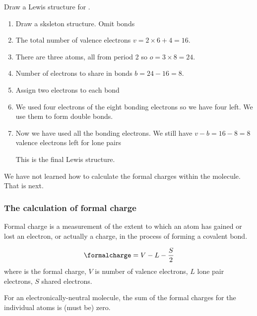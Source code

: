 \documentclass[../mit-general-chemistry.tex]{subfiles}
\begin{document}
\begin{example}
  Draw a Lewis structure for .

  \begin{enumerate}
  \item Draw a sksleton structure. Omit bonds
  \item The total number of valence electrons $v = 2\times 6 + 4 =
    16$.
  \item There are three atoms, all from period 2 so $o = 3\times 8 = 24$.
  \item Number of electrons to share in bonds $b = 24 - 16 = 8$.
  \item Assign two electrons to each bond
    \begin{center}
    \end{center}
  \item We used four electrons of the eight bonding electrons so we
    have four left. We use them to form double bonds.
    \begin{center}
    \end{center}
  \item Now we have used all the bonding electrons. We still have $v -
    b = 16 - 8 = 8$ valence electrons left for lone pairs
    \begin{center}
    \end{center}
    This is the final Lewis structure.
  \end{enumerate}

  We have not learned how to calculate the formal charges within the
  molecule. That is next.
\end{example}


\subsubsection{The calculation of formal charge}

Formal charge is a measurement of the extent to which an atom has
gained or lost an electron, or actually a charge, in the process of
forming a covalent bond.


\begin{equation*}
  \formalcharge = V - L - \frac{S}{2}
\end{equation*}
where \formalcharge is the formal charge, $V$ is number of valence electrons,
$L$ lone pair electrons, $S$ shared electrons.

For an electronically-neutral molecule, the sum of the formal charges
for the individual atoms is (must be) zero.
\end{document}
